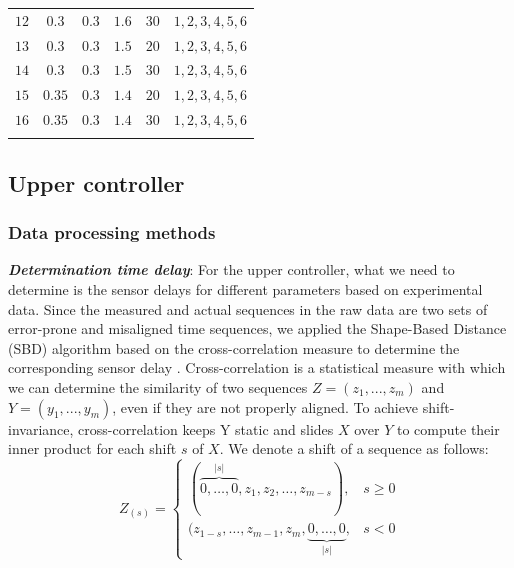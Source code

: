 \documentclass[journal]{IEEEtran}
\begin{document}
\begin{table}
{\begin{tabular}{lccccl}
      $12$             & $0.3$                     & $0.3 $                    & $1.6$                 & $30$          & $1,2,3,4,5,6$                 \\
      $13$             & $0.3$                     & $0.3 $                    & $1.5$                 & $20$          & $1,2,3,4,5,6$                 \\
      $14$             & $0.3$                     & $0.3 $                    & $1.5$                 & $30$          & $1,2,3,4,5,6$                 \\
      $15$             & $0.35$                    & $0.3 $                    & $1.4$                 & $20$          & $1,2,3,4,5,6$                 \\
      $16$             & $0.35$                    & $0.3 $                    & $1.4$                 & $30$          & $1,2,3,4,5,6$                 \\
      \bottomrule
      \label{table1}
    \end{tabular}}
\end{table}











\subsection{Upper controller}
\label{Section 3.2}

\subsubsection{Data processing methods}
\label{Section 3.2.1}

\textbf{\emph{Determination time delay}}: For the upper controller, what we need to determine is the sensor delays for different parameters based on experimental data. Since the measured and actual sequences in the raw data are two sets of error-prone and misaligned time sequences, we applied the Shape-Based Distance (SBD) algorithm based on the cross-correlation measure to determine the corresponding sensor delay \citep{Paparrizos2015}.
Cross-correlation is a statistical measure with which we can determine the similarity of two sequences $Z = (z_1,..., z_m)$ and $Y = (y_1,..., y_m)$, even if they are not properly aligned. To achieve shift-invariance, cross-correlation keeps Y static and slides $X$ over $Y$ to compute their inner product for each shift $s$ of $X$. We denote a shift of a sequence as follows:
\begin{equation}
  Z_{(s)}= \begin{cases}(\overbrace{0, \ldots, 0}^{|s|}, z_{1}, z_{2}, \ldots, z_{m-s}), & s \geq 0 \\ (z_{1-s}, \ldots, z_{m-1}, z_{m}, \underbrace{0, \ldots, 0}_{|s|}, & s<0\end{cases}
  \label{Eq5}
\end{equation}
\end{document}
